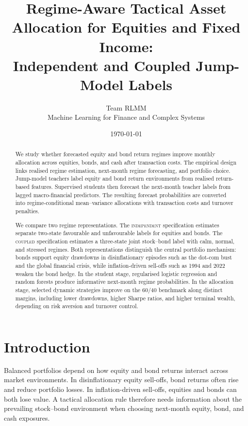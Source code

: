﻿\documentclass[10pt]{article}
\title{Regime-Aware Tactical Asset Allocation for Equities and Fixed Income:\\
Independent and Coupled Jump-Model Labels}
\author{%
Team RLMM\\
\normalsize Machine Learning for Finance and Complex Systems}
\date{\today}
\newcommand{\Acoup}{\textsc{coupled}}
\newcommand{\Bindep}{\textsc{independent}}
\begin{document}
\maketitle
\thispagestyle{empty}


\begin{abstract}
    \noindent We study whether forecasted equity and bond return regimes improve monthly allocation across equities, bonds, and cash after transaction costs. The empirical design links realised regime estimation, next-month regime forecasting, and portfolio choice. Jump-model teachers label equity and bond return environments from realised return-based features. Supervised students then forecast the next-month teacher labels from lagged macro-financial predictors. The resulting forecast probabilities are converted into regime-conditional mean--variance allocations with transaction costs and turnover penalties.

    \noindent We compare two regime representations. The \Bindep{} specification estimates separate two-state favourable and unfavourable labels for equities and bonds. The \Acoup{} specification estimates a three-state joint stock--bond label with calm, normal, and stressed regimes. Both representations distinguish the central portfolio mechanism: bonds support equity drawdowns in disinflationary episodes such as the dot-com bust and the global financial crisis, while inflation-driven sell-offs such as 1994 and 2022 weaken the bond hedge. In the student stage, regularised logistic regression and random forests produce informative next-month regime probabilities. In the allocation stage, selected dynamic strategies improve on the 60/40 benchmark along distinct margins, including lower drawdowns, higher Sharpe ratios, and higher terminal wealth, depending on risk aversion and turnover control.
\end{abstract}


\section{Introduction}

Balanced portfolios depend on how equity and bond returns interact across market environments. In disinflationary equity sell-offs, bond returns often rise and reduce portfolio losses. In inflation-driven sell-offs, equities and bonds can both lose value. A tactical allocation rule therefore needs information about the prevailing stock--bond environment when choosing next-month equity, bond, and cash exposures.
\end{document}
